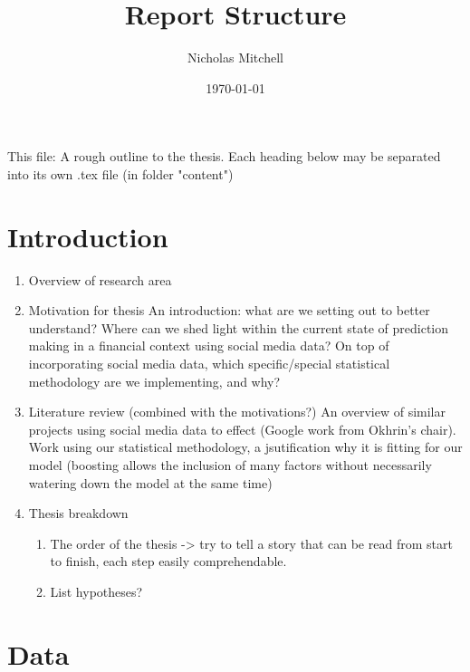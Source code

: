 \documentclass{article}
\author{Nicholas Mitchell}
\date{\today}
\title{Report Structure}
\begin{document}
\maketitle
\tableofcontents

\pagebreak

This file: A rough outline to the thesis. Each heading below may be separated into its own .tex file (in folder "content")


\section{Introduction}
\label{sec-1}

\begin{enumerate}
\item Overview of research area
\label{sec-1-1}

\item Motivation for thesis
\label{sec-1-2}
An introduction: what are we setting out to better understand? Where can we shed light within the current state of prediction making in a financial context using social media data?
On top of incorporating social media data, which specific/special statistical methodology are we implementing, and why?

\item Literature review (combined with the motivations?)
\label{sec-1-3}
An overview of similar projects using social media data to effect (Google work from Okhrin's chair).
Work using our statistical methodology, a jsutification why it is fitting for our model (boosting allows the inclusion of many factors without necessarily watering down the model at the same time)

\item Thesis breakdown
\label{sec-1-4}

\begin{enumerate}
\item The order of the thesis -> try to tell a story that can be read from start to finish, each step easily comprehendable.
\label{sec-1-4-1}

\item List hypotheses?
\label{sec-1-4-2}
\end{enumerate}
\end{enumerate}


\section{Data}
\label{sec-2}
\end{document}
